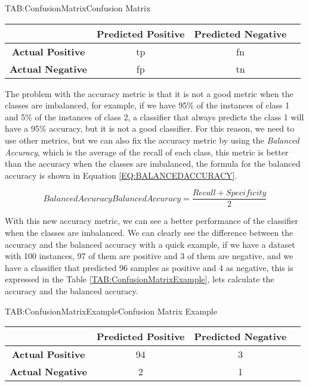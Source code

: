 \begin{table}[Confusion Matrix]{TAB:ConfusionMatrix}{Confusion Matrix}
    \begin{tabular}{cccc}
            \hline
            & \textbf{Predicted Positive} & \textbf{Predicted Negative} \\
            \hline \hline
            \textbf{Actual Positive} & \acl{tp} & \acl{fn} \\
            \textbf{Actual Negative} & \acl{fp}  & \acl{tn} \\
            \hline
        \end{tabular}
\end{table}


The problem with the accuracy metric is that it is not a good metric when the classes are imbalanced, for example, if we have 95\% of the instances of class 1 and 5\% of the instances of class 2, a classifier that always predicts the class 1 will have a 95\% accuracy, but it is not a good classifier. For this reason, we need to use other metrics, but we can also fix the accuracy metric by using the \textit{Balanced Accuracy}, which is the average of the recall of each class, this metric is better than the accuracy when the classes are imbalanced, the formula for the balanced accuracy is shown in Equation \ref{EQ:BALANCEDACCURACY}.

\begin{equation}[EQ:BALANCEDACCURACY]{Balanced Accuracy}
    \boxed{Balanced Accuracy = \frac{Recall + Specificity}{2}}
\end{equation}

With this new accuracy metric, we can see a better performance of the classifier when the classes are imbalanced. We can clearly see the difference between the accuracy and the balanced accuracy with a quick example, if we have a dataset with 100 instances, 97 of them are positive and 3 of them are negative, and we have a classifier that predicted 96 samples as positive and 4 as negative, this is expressed in the Table \ref{TAB:ConfusionMatrixExample}, lets calculate the accuracy and the balanced accuracy.

\begin{table}[Confusion Matrix Example]{TAB:ConfusionMatrixExample}{Confusion Matrix Example}
    \begin{tabular}{cccc}
            \hline
            & \textbf{Predicted Positive} & \textbf{Predicted Negative} \\
            \hline \hline
            \textbf{Actual Positive} & 94 & 3 \\
            \textbf{Actual Negative} & 2 & 1 \\
            \hline
        \end{tabular}
\end{table}


